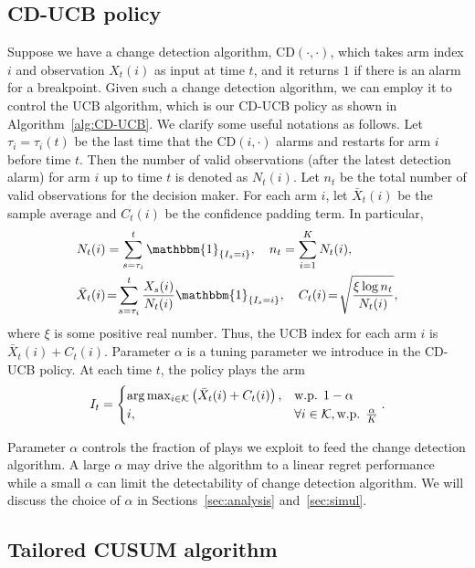 \documentclass[letterpaper]{article}
\newcommand{\magenta}{}
\begin{document}
\subsection{CD-UCB policy}
Suppose we have a change detection algorithm, CD$(\cdot,\cdot)$, which takes arm index $i$ and observation $X_t(i)$ as input at time $t$, and it returns $1$ if there is an alarm for a breakpoint. Given such a change detection algorithm, we can employ it to control the UCB algorithm, which is our CD-UCB policy as shown in Algorithm~\ref{alg:CD-UCB}. We clarify some useful notations as follows.
{\magenta Let $\tau_i = \tau_i(t)$ be the last time that the CD$(i,\cdot)$ alarms and restarts for arm $i$ before time $t$.}
Then the number of valid observations (after the latest detection alarm) for arm $i$ up to time $t$ is denoted as $N_t(i)$. Let $n_t$ be the total number of valid observations for the decision maker. For each arm $i$, let $\bar{X}_t(i)$ be the sample average and $C_t(i)$ be the confidence padding term. In particular,
\begin{align}\label{eqn:update}
N_t(i)&=\sum_{s=\tau_i}^t\mathbbm{1}_{\{I_s=i\}},~~~n_t=\sum_{i=1}^K N_t(i),\\
\bar{X}_t(i) &\!=\! \sum_{s=\tau_i}^t\frac{X_s(i)}{N_t(i)}\mathbbm{1}_{\{I_s=i\}},~~~C_t(i) \!=\!  \sqrt{\frac{\xi\log{n_t}}{N_t(i)}},
\end{align}
where $\xi$ is some positive real number.
Thus, the UCB index for each arm $i$ is $\bar{X}_t(i)+C_t(i)$. Parameter $\alpha$ is a tuning parameter we introduce in the CD-UCB policy. At each time $t$, the policy plays the arm %
\begin{eqnarray}\label{eqn:It}
I_t=
\begin{cases}
\arg\max_{i\in\mathcal{K}}\left(\bar{X}_t(i)+C_t(i)\right),  &\text{w.p. } 1-\alpha\cr
i, & \forall i \in \mathcal{K}, \text{w.p. } \frac{\alpha}{K}
\end{cases}.
\end{eqnarray}


Parameter $\alpha$
controls the fraction of plays we exploit to feed the change detection algorithm. A large $\alpha$ may drive the algorithm to a linear regret performance while a small $\alpha$ can limit the detectability of change detection algorithm. We will discuss the choice of $\alpha$ in Sections~\ref{sec:analysis} and~\ref{sec:simul}.

\subsection{Tailored CUSUM algorithm}
\end{document}
